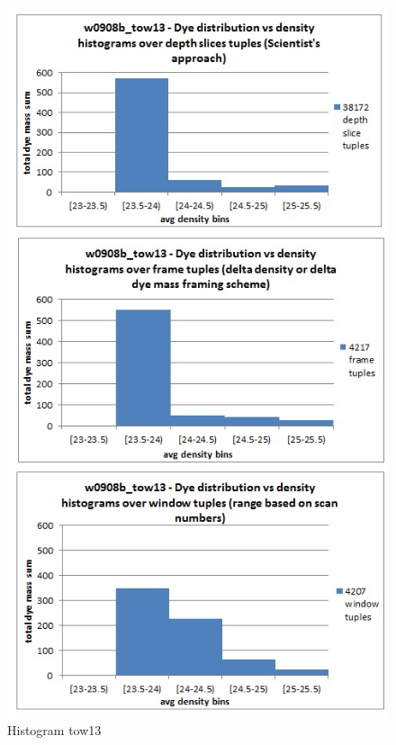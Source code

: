 \documentclass{vldb}
\begin{document}
\begin{figure}[tb]
   \centering
   \includegraphics[width=.99\columnwidth]{figures/histogram_tow13}
   \caption{Histogram tow13}
   \label{fig:eval-histogram-tow13}
\end{figure}
\end{document}
